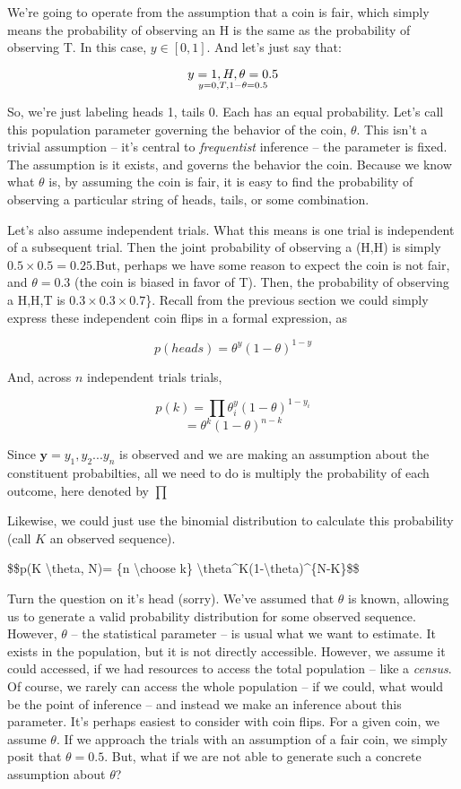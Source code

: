 \documentclass[
]{book}
\begin{document}
We're going to operate from the assumption that a coin is fair, which simply means the probability of observing an H is the same as the probability of observing T. In this case, \(y \in [0 , 1]\). And let's just say that:

\[y = {1, H, \theta=0.5}\atop  {y=0, T, 1-\theta=0.5} \]

So, we're just labeling heads 1, tails 0. Each has an equal probability. Let's call this population parameter governing the behavior of the coin, \(\theta\). This isn't a trivial assumption -- it's central to \emph{frequentist} inference -- the parameter is fixed. The assumption is it exists, and governs the behavior the coin. Because we know what \(\theta\) is, by assuming the coin is fair, it is easy to find the probability of observing a particular string of heads, tails, or some combination.

Let's also assume independent trials. What this means is one trial is independent of a subsequent trial. Then the joint probability of observing a (H,H) is simply \(0.5 \times 0.5=0.25\).But, perhaps we have some reason to expect the coin is not fair, and \(\theta=0.3\) (the coin is biased in favor of T). Then, the probability of observing a H,H,T is \(0.3 \times 0.3 \times 0.7\)\}. Recall from the previous section we could simply express these independent coin flips in a formal expression, as

\[p(heads)=\theta^y(1-\theta)^{1-y}\]

And, across \(n\) independent trials trials,

\[p(k)=\prod\theta^y_i(1-\theta)^{1-y_i}\] \[=\theta^k(1-\theta)^{n-k}\]

Since \(\textbf{y}=y_1, y_2...y_n\) is observed and we are making an assumption about the constituent probabilties, all we need to do is multiply the probability of each outcome, here denoted by \(\prod\)

Likewise, we could just use the binomial distribution to calculate this probability (call \(K\) an observed sequence).

\$\$p(K \textbar{} \textbackslash theta, N)= \{n \textbackslash choose k\} \textbackslash theta\^{}K(1-\textbackslash theta)\^{}\{N-K\}\$\$

Turn the question on it's head (sorry). We've assumed that \(\theta\) is known, allowing us to generate a valid probability distribution for some observed sequence. However, \(\theta\) -- the statistical parameter -- is usual what we want to estimate. It exists in the population, but it is not directly accessible. However, we assume it could accessed, if we had resources to access the total population -- like a \emph{census}. Of course, we rarely can access the whole population -- if we could, what would be the point of inference -- and instead we make an inference about this parameter. It's perhaps easiest to consider with coin flips. For a given coin, we assume \(\theta\). If we approach the trials with an assumption of a fair coin, we simply posit that \(\theta=0.5\). But, what if we are not able to generate such a concrete assumption about \(\theta\)?
\end{document}
